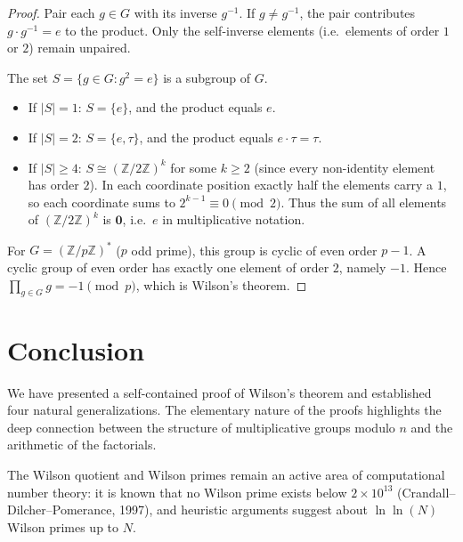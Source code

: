 \documentclass[12pt,a4paper]{amsart}
\theoremstyle{definition}
\newcommand{\Z}{\mathbb{Z}}
\begin{document}
\begin{proof}
  Pair each $g \in G$ with its inverse $g^{-1}$.  If $g \ne g^{-1}$,
  the pair contributes $g \cdot g^{-1} = e$ to the product.
  Only the self-inverse elements (i.e.\ elements of order $1$ or $2$)
  remain unpaired.

  The set $S = \{g \in G : g^2 = e\}$ is a subgroup of $G$.
  \begin{itemize}
    \item If $|S| = 1$: $S = \{e\}$, and the product equals $e$.
    \item If $|S| = 2$: $S = \{e, \tau\}$, and the product equals $e \cdot \tau = \tau$.
    \item If $|S| \geq 4$: $S \cong (\Z/2\Z)^k$ for some $k \geq 2$
      (since every non-identity element has order $2$).
      In each coordinate position exactly half the elements carry a $1$,
      so each coordinate sums to $2^{k-1} \equiv 0 \pmod 2$.
      Thus the sum of all elements of $(\Z/2\Z)^k$ is $\mathbf{0}$, i.e.\ $e$
      in multiplicative notation.
  \end{itemize}
  For $G = (\Z/p\Z)^*$ ($p$ odd prime), this group is cyclic of even order $p-1$.
  A cyclic group of even order has exactly one element of order $2$, namely $-1$.
  Hence $\prod_{g \in G} g = -1 \pmod p$, which is Wilson's theorem. \qedhere
\end{proof}

\section{Conclusion}

We have presented a self-contained proof of Wilson's theorem and established
four natural generalizations.  The elementary nature of the proofs highlights
the deep connection between the structure of multiplicative groups modulo $n$
and the arithmetic of the factorials.

The Wilson quotient and Wilson primes remain an active area of computational
number theory: it is known that no Wilson prime exists below $2 \times 10^{13}$
(Crandall--Dilcher--Pomerance, 1997), and heuristic arguments suggest
about $\ln\ln(N)$ Wilson primes up to $N$.
\end{document}
